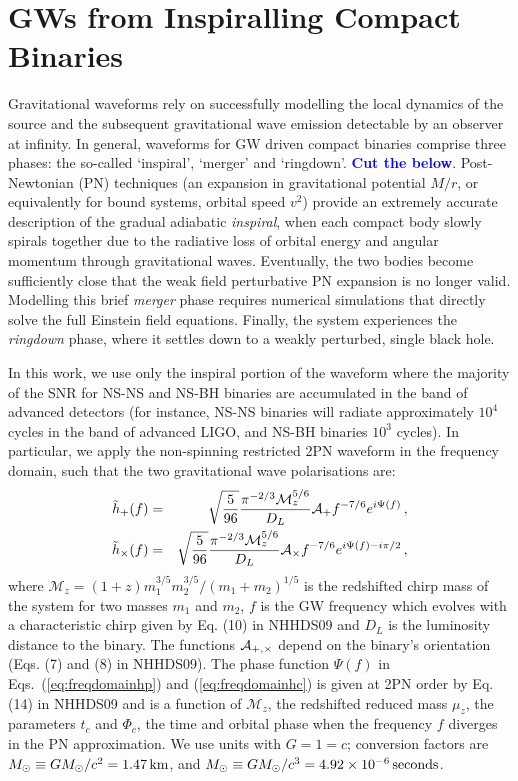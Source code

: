 \documentclass{emulateapj}
\newcommand{\samaya}[1]{\textcolor{blue}{\bf #1}}
\begin{document}
\section{GWs from Inspiralling Compact Binaries}


Gravitational waveforms rely on successfully modelling the local
dynamics of the source and the subsequent gravitational wave emission
detectable by an observer at infinity. In general, waveforms for
GW driven compact binaries
comprise three phases: the so-called `inspiral', `merger' and
`ringdown'. \samaya{Cut the below}. Post-Newtonian (PN) techniques (an expansion in gravitational
potential $M/r$, or equivalently for bound systems, orbital speed
$v^2$) provide an extremely accurate description of the gradual
adiabatic {\it inspiral}, when each compact body slowly spirals together due
to the radiative loss of orbital energy and angular momentum through
gravitational waves. Eventually, the two bodies become sufficiently
close that the weak field perturbative PN expansion is no
longer valid. Modelling this brief {\sl merger} phase requires numerical
simulations that directly solve the full Einstein
field equations. Finally, the system experiences the {\sl ringdown}
phase, where it settles down
to a weakly perturbed, single black hole. 

In this work, we use only the inspiral portion of the waveform where
the majority of the SNR for NS-NS and NS-BH binaries are
accumulated in the band of
advanced detectors (for instance, NS-NS binaries will
radiate approximately $10^4$ cycles in the band of advanced LIGO, and NS-BH
binaries $10^3$ cycles). In particular, we apply the non-spinning restricted 2PN
waveform in the frequency domain, such that the two gravitational wave
polarisations are:
\begin{eqnarray}
\tilde{h}_+(f) &=& \sqrt{\frac{5}{96}}\frac{\pi^{-2/3} {\mathcal
M}_z^{5/6}}{D_L}{\cal A}_+ f^{-7/6} e^{i\Psi(f)} \, ,
\label{eq:freqdomainhp}
\\
\tilde{h}_\times(f) &=& \sqrt{\frac{5}{96}}\frac{\pi^{-2/3} {\mathcal
M}_z^{5/6}}{D_L}{\cal A}_\times f^{-7/6} e^{i\Psi(f) - i\pi/2} \, ,
\label{eq:freqdomainhc}
\end{eqnarray}
where $ {\mathcal
M}_z = (1+z) m_1^{3/5} m_2^{3/5}/(m_1 + m_2)^{1/5}$ is the redshifted chirp mass of the system for two masses $m_1$ and $m_2$, $f$ is the GW frequency which evolves with a characteristic chirp given by Eq. (10) in NHHDS09 and $D_L$ is the luminosity
distance to the binary. The functions ${\cal A}_{+,\times}$ depend on the binary's orientation (Eqs. (7) and (8) in NHHDS09). The phase function $\Psi(f)$ in Eqs.\
(\ref{eq:freqdomainhp}) and (\ref{eq:freqdomainhc}) is given at 2PN order by Eq. (14) in NHHDS09 and is a function of ${\mathcal
M}_z$, the redshifted reduced mass $\mu_z$, the parameters $t_c$ and $\Phi_c$, the time and orbital phase when the frequency $f$ diverges in the PN approximation.  
We use units with $G = 1 = c$; conversion factors are $M_\odot
\equiv GM_\odot/c^2 = 1.47\,{\rm km}$, and $M_\odot \equiv
GM_\odot/c^3 = 4.92 \times 10^{-6}\,{\rm seconds}$. 
\end{document}
